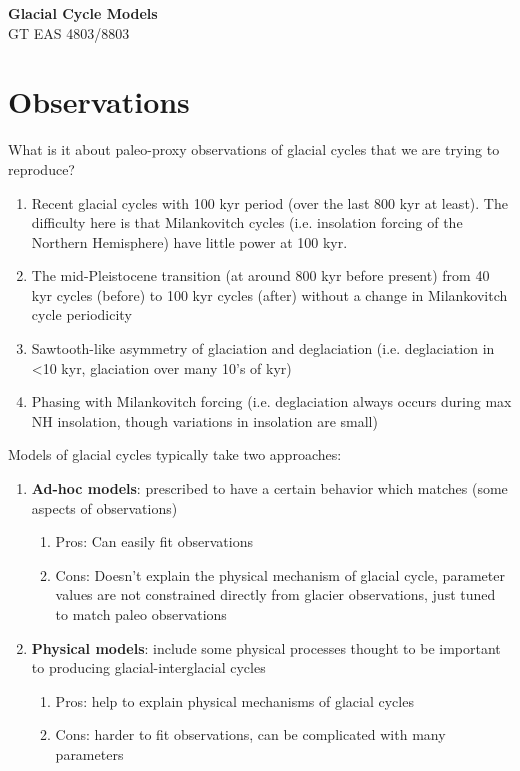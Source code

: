 \documentclass[12pt]{article}
\theoremstyle{definition}
\begin{document}
\thispagestyle{empty}

\begin{center}
{\LARGE \bf Glacial Cycle Models}\\
{\large GT EAS 4803/8803}\\
\end{center}
\section{Observations}
What is it about paleo-proxy observations of glacial cycles that we are trying to reproduce?

\begin{enumerate}
\item Recent glacial cycles with 100 kyr period (over the last 800 kyr at least). The difficulty here is that Milankovitch cycles (i.e. insolation forcing of the Northern Hemisphere) have little power at 100 kyr.
\item The mid-Pleistocene transition (at around 800 kyr before present) from 40 kyr cycles (before) to 100 kyr cycles (after) without a change in Milankovitch cycle periodicity
\item Sawtooth-like asymmetry of glaciation and deglaciation (i.e. deglaciation in <10 kyr, glaciation over many 10's of kyr)
\item Phasing with Milankovitch forcing (i.e. deglaciation always occurs during max NH insolation, though variations in insolation are small)
\end{enumerate}

Models of glacial cycles typically take two approaches:
\begin{enumerate}
\item \textbf{Ad-hoc models}: prescribed to have a certain behavior which matches (some aspects of observations)
\begin{enumerate}
\item Pros: Can easily fit observations
\item Cons: Doesn't explain the physical mechanism of glacial cycle, parameter values are not constrained directly from glacier observations, just tuned to match paleo observations
\end{enumerate}
\item \textbf{Physical models}: include some physical processes thought to be important to producing glacial-interglacial cycles
\begin{enumerate}
\item Pros: help to explain physical mechanisms of glacial cycles
\item Cons: harder to fit observations, can be complicated with many parameters
\end{enumerate}
\end{enumerate}
\end{document}
